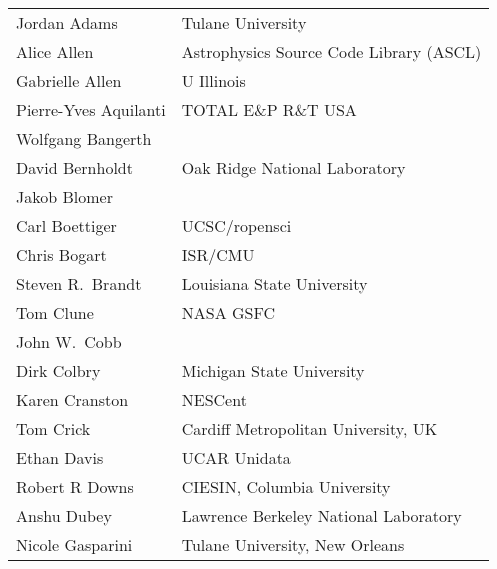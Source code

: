 \documentclass[11pt, oneside]{amsart}
\begin{document}
{\small
\begin{longtable}{ll}
   Jordan Adams          &  Tulane University                                                                    
\\ Alice Allen           &  Astrophysics Source Code Library (ASCL)                                              
\\ Gabrielle Allen       &  U Illinois                                                                           
\\ Pierre-Yves Aquilanti &  TOTAL E\&P R\&T USA                                                                  
\\ Wolfgang Bangerth     
\\ David Bernholdt       &  Oak Ridge National Laboratory                                                        
\\ Jakob Blomer          
\\ Carl Boettiger        &  UCSC/ropensci                                                                        
\\ Chris Bogart          &  ISR/CMU                                                                              
\\ Steven R.~Brandt      &  Louisiana State University                                                           
\\ Tom Clune             &  NASA GSFC                                                                            
\\ John W.~Cobb          
\\ Dirk Colbry           &  Michigan State University                                                            
\\ Karen Cranston        &  NESCent                                                                              
\\ Tom Crick             &  Cardiff Metropolitan University, UK                                                  
\\ Ethan Davis           &  UCAR Unidata                                                                         
\\ Robert R Downs        &  CIESIN, Columbia University                                                          
\\ Anshu Dubey           &  Lawrence Berkeley National Laboratory                                                
\\ Nicole Gasparini      &  Tulane University, New Orleans                                                       

\end{longtable}}
\end{document}
